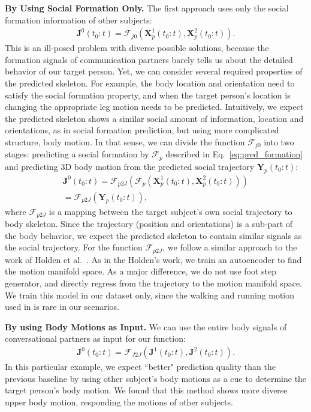\textbf{By Using Social Formation Only.} The first approach uses only the social formation information of other subjects:
\begin{gather}	
\mathbf{J}^0(t_0:t) = \mathcal{F}_{j0} \left( \mathbf{X}_p^1(t_0:t), \mathbf{X}_p^2(t_0:t) \right).
\end{gather}
This is an ill-posed problem with diverse possible solutions, because the formation signals of communication partners barely tells us about the detailed behavior of our target person. Yet, we can consider several required properties of the predicted skeleton. For example, the body location and orientation need to satisfy the social formation property, and when the target person's location is changing the appropriate leg motion needs to be predicted. Intuitively, we expect the predicted skeleton shows a similar social amount of information, location and orientations, as in social formation prediction, but using more complicated structure, body motion. In that sense, we can divide the function $\mathcal{F}_{j0}$ into two stages: predicting a social formation by $\mathcal{F}_p$ described in Eq.~\ref{eq:pred_formation} and predicting 3D body motion from the predicted social trajectory $\mathbf{Y}_p (t_0:t)$:
\begin{gather}	
 \mathbf{J}^0 (t_0:t) = \mathcal{F}_{p2J} \left(   \mathcal{F}_p \left( \mathbf{X}_p^1(t_0:t), \mathbf{X}_p^2(t_0:t) \right) \right) \nonumber \\ 
 = \mathcal{F}_{p2J} \left( \mathbf{Y}_p (t_0:t)  \right),
 \label{eq:pred_p2J}
\end{gather}
where $\mathcal{F}_{p2J}$ is a mapping between the target subject's own social trajectory to body skeleton. Since the trajectory (position and orientations) is a sub-part of the body behavior, we expect the predicted skeleton to contain similar signals as the social trajectory. For the function $\mathcal{F}_{p2J}$, we follow a similar approach to the work of Holden et al.~\cite{holden2016deep}. As in the Holden's work, we train an autoencoder to find the motion manifold space. As a major difference, we do not use foot step generator, and directly regress from the trajectory to the motion manifold space. We train this model in our dataset only, since the walking and running motion used in \cite{holden2016deep} is rare in our scenarios. 

\textbf{By using Body Motions as Input.} We can use the entire body signals of conversational partners as input for our function:
\begin{gather}	
\mathbf{J}^0 (t_0:t) = \mathcal{F}_{J2J} \left( \mathbf{J}^1 (t_0:t), \mathbf{J}^2 (t_0:t) \right) .
\end{gather}
In this particular example, we expect ``better" prediction quality than the previous baseline by using other subject's body motions as a cue to determine the target person's body motion. We found that this method shows more diverse upper body motion, responding the motions of other subjects. 

